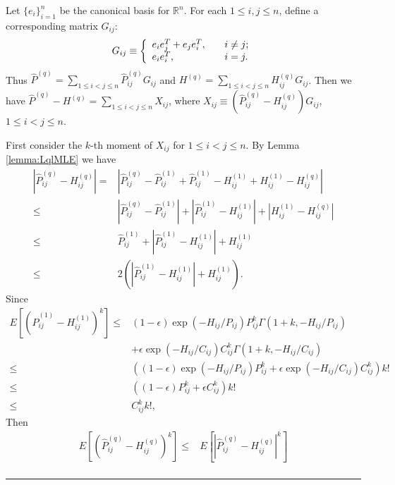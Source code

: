 \documentclass[a4paper]{article}
\newenvironment{proof}{{\bf Proof:  }}{\hfill\rule{2mm}{2mm}}
\begin{document}
\noindent
\begin{proof}
Let $\{e_i\}_{i=1}^n$ be the canonical basis for $\mathbb{R}^n$. For each $1 \le i, j \le n$, define a corresponding matrix $G_{ij}$:
\[
    G_{ij} \equiv \left\{
    \begin{array}{l l}
        e_i e_j^T + e_j e_i^T, \quad & i \ne j;\\
        e_i e_i^T, \quad & i = j.
    \end{array}
    \right.
\]
Thus $\hat{P}^{(q)} = \sum_{1 \le i < j \le n} \hat{P}^{(q)}_{ij} G_{ij}$ and $H^{(q)} = \sum_{1 \le i < j \le n} H^{(q)}_{ij} G_{ij}$. Then we have $\hat{P}^{(q)} - H^{(q)} = \sum_{1 \le i < j \le n} X_{ij}$, where $X_{ij} \equiv \left( \hat{P}^{(q)}_{ij} - H^{(q)}_{ij} \right) G_{ij}$, $1 \le i < j \le n$.

First consider the $k$-th moment of $X_{ij}$ for $1 \le i < j \le n$. By Lemma \ref{lemma:LqlMLE} we have
\begin{align*}
	\left| \hat{P}^{(q)}_{ij} - H^{(q)}_{ij} \right|
    = & \left| \hat{P}^{(q)}_{ij} - \hat{P}^{(1)}_{ij} + \hat{P}^{(1)}_{ij} - H^{(1)}_{ij} + H^{(1)}_{ij} - H^{(q)}_{ij} \right| \\
    \le & \left| \hat{P}^{(q)}_{ij} - \hat{P}^{(1)}_{ij} \right| + \left| \hat{P}^{(1)}_{ij} - H^{(1)}_{ij} \right| + \left| H^{(1)}_{ij} - H^{(q)}_{ij} \right| \\
    \le & \hat{P}^{(1)}_{ij} + \left| \hat{P}^{(1)}_{ij} - H^{(1)}_{ij} \right| +  H^{(1)}_{ij} \\
    \le & 2 \left( \left| \hat{P}^{(1)}_{ij} - H^{(1)}_{ij} \right| + H^{(1)}_{ij} \right).
\end{align*}
Since
\begin{align*}
	E[(\hat{P}^{(1)}_{ij} - H^{(1)}_{ij})^k]
    \le & (1-\epsilon) \exp(-H_{ij}/P_{ij}) P_{ij}^k \Gamma(1+k, -H_{ij}/P_{ij}) \\
    & + \epsilon \exp(-H_{ij}/C_{ij}) C_{ij}^k \Gamma(1+k, -H_{ij}/C_{ij}) \\
    \le & \left( (1-\epsilon) \exp(-H_{ij}/P_{ij}) P_{ij}^k + \epsilon \exp(-H_{ij}/C_{ij}) C_{ij}^k \right) k! \\
    \le & \left( (1-\epsilon) P_{ij}^k + \epsilon C_{ij}^k \right) k! \\
    \le & C_{ij}^k k!,
\end{align*}
Then
\begin{align*}
	E[(\hat{P}^{(q)}_{ij} - H^{(q)}_{ij})^k]
    \le & E\left[\left|\hat{P}^{(q)}_{ij} - H^{(q)}_{ij}\right|^k\right] \\

\end{align*}
\end{proof}
\end{document}
